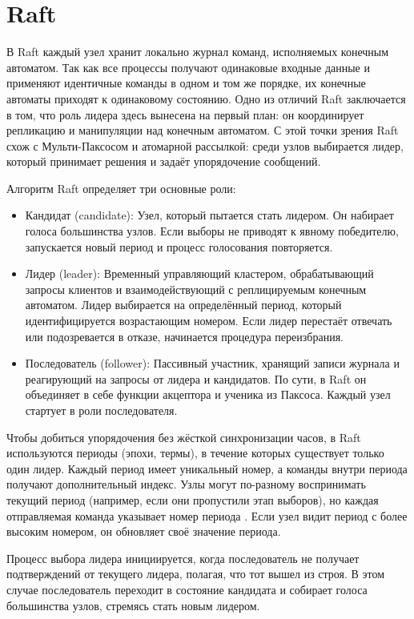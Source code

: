 \section{Raft}

В Raft каждый узел хранит локально журнал команд, исполняемых конечным автоматом.
Так как все процессы получают одинаковые входные данные и применяют идентичные
команды в одном и том же порядке, их конечные автоматы приходят к одинаковому
состоянию. Одно из отличий Raft заключается в том, что роль лидера здесь
вынесена на первый план: он координирует репликацию и манипуляции над конечным
автоматом. С этой точки зрения Raft схож с Мульти-Паксосом и атомарной рассылкой:
среди узлов выбирается лидер, который принимает решения и задаёт упорядочение
сообщений.

Алгоритм Raft определяет три основные роли:

\begin{itemize}
    \item Кандидат (candidate): Узел, который пытается стать лидером. Он набирает
        голоса большинства узлов. Если выборы не приводят к явному победителю,
        запускается новый период и процесс голосования повторяется.
    \item Лидер (leader): Временный управляющий кластером, обрабатывающий запросы
        клиентов и взаимодействующий с реплицируемым конечным автоматом. Лидер
        выбирается на определённый период, который идентифицируется возрастающим
        номером. Если лидер перестаёт отвечать или подозревается в отказе,
        начинается процедура переизбрания.
    \item Последователь (follower): Пассивный участник, хранящий записи журнала
        и реагирующий на запросы от лидера и кандидатов. По сути, в Raft он
        объединяет в себе функции акцептора и ученика из Паксоса. Каждый узел
        стартует в роли последователя.
\end{itemize}

Чтобы добиться упорядочения без жёсткой синхронизации часов, в Raft используются
периоды (эпохи, термы), в течение которых существует только один лидер. Каждый
период имеет уникальный номер, а команды внутри периода получают дополнительный
индекс. Узлы могут по-разному воспринимать текущий период (например, если они
пропустили этап выборов), но каждая отправляемая команда указывает номер
периода \cite{ongario2014}. Если узел видит период с более высоким номером, он
обновляет своё значение периода.

Процесс выбора лидера инициируется, когда последователь не получает подтверждений
от текущего лидера, полагая, что тот вышел из строя. В этом случае последователь
переходит в состояние кандидата и собирает голоса большинства узлов, стремясь
стать новым лидером.

